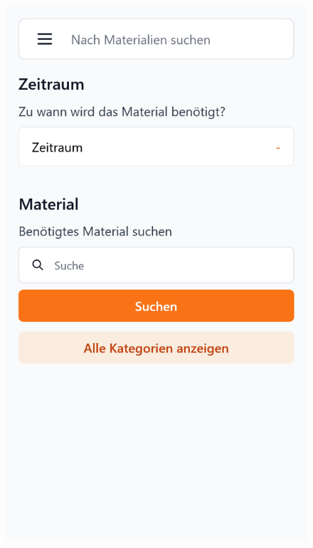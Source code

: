 \begin{figure}[p]
    \includegraphics[scale=0.19]{Bilder/Dialgobeispiel/Suiche2.png} 

\end{figure}
